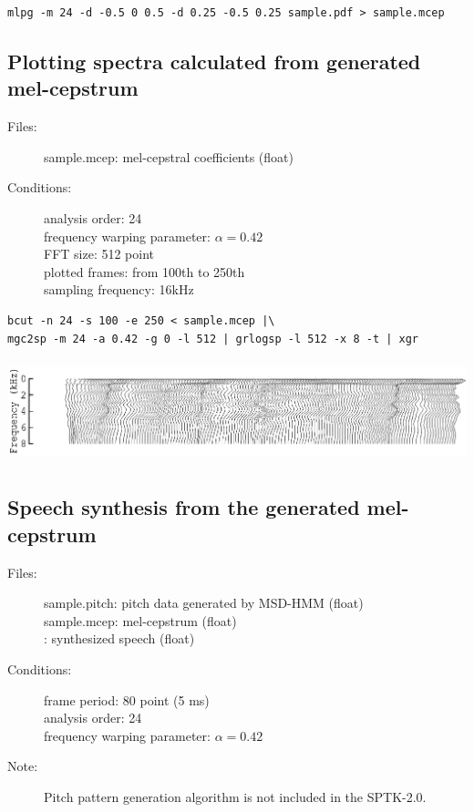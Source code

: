 \documentclass[a4paper]{article}
\begin{document}
\begin{verbatim}
mlpg -m 24 -d -0.5 0 0.5 -d 0.25 -0.5 0.25 sample.pdf > sample.mcep
\end{verbatim}

\subsection{Plotting spectra calculated from generated mel-cepstrum}

\begin{description}
\item[Files:]
  sample.mcep: mel-cepstral coefficients (float)
\item[Conditions:]
  analysis order: 24\\
  frequency warping parameter: $\alpha = 0.42$\\
  FFT size: 512 point\\
  plotted frames: from 100th to 250th\\
  sampling frequency: 16kHz
\end{description}

\begin{verbatim}
bcut -n 24 -s 100 -e 250 < sample.mcep |\
mgc2sp -m 24 -a 0.42 -g 0 -l 512 | grlogsp -l 512 -x 8 -t | xgr
\end{verbatim}

\includegraphics[height=3cm]{sample.mcep.grlogsp-t.eps}

\subsection{Speech synthesis from the generated mel-cepstrum}

\begin{description}
\item[Files:]
  sample.pitch: pitch data generated by MSD-HMM (float)\\
  sample.mcep: mel-cepstrum (float) \\
  : 
  synthesized speech (float)
\item[Conditions:]
  frame period: 80 point (5 ms)\\
  analysis order: 24\\
  frequency warping parameter: $\alpha = 0.42$
\item[Note:]
  Pitch pattern generation algorithm is not included in the SPTK-2.0.
\end{description}
\end{document}
